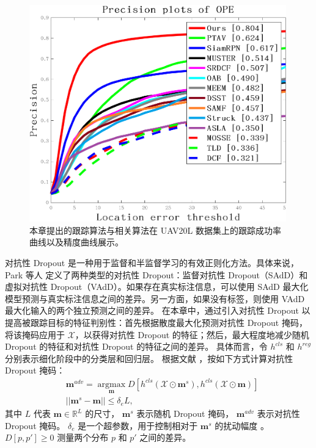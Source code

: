 \begin{figure}[t]
\begin{minipage}{0.48\textwidth}
  \centerline{\includegraphics[width=0.99\textwidth]{Img/end/quality_plot_error_OPE_threshold.png}}
\end{minipage}
\caption{本章提出的跟踪算法与相关算法在 UAV20L \cite{mueller2016benchmark} 数据集上的跟踪成功率曲线以及精度曲线展示。}
\label{fig:end_uav20l}
\end{figure}
对抗性 Dropout 是一种用于监督和半监督学习的有效正则化方法。具体来说，Park 等人 \cite{park2018adversarial} 定义了两种类型的对抗性 Dropout：监督对抗性 Dropout（SAdD）和虚拟对抗性 Dropout（VAdD）。如果存在真实标注信息，可以使用 SAdD 最大化模型预测与真实标注信息之间的差异。另一方面，如果没有标签，则使用 VAdD 最大化输入的两个独立预测之间的差异。%
在本章中，通过引入对抗性 Dropout 以提高被跟踪目标的特征判别性：首先根据散度最大化预测对抗性 Dropout 掩码，将该掩码应用于 $\mathcal{X}$，以获得对抗性 Dropout 的特征；然后，最大程度地减少随机 Dropout 的特征和对抗性 Dropout 的特征之间的差异。
具体而言，令 $h^{cls}$ 和 $h^{reg}$ 分别表示细化阶段中的分类层和回归层。
根据文献 \cite{lee2019drop}，按如下方式计算对抗性 Dropout 掩码：
\begin{equation}
\begin{split}
    & \mathbf{m}^{adv} = \mathop{\arg\max}\limits_{\mathbf{m}}D[h^{cls}(\mathcal{X} \odot \mathbf{m}^s), h^{cls}(\mathcal{X} \odot \mathbf{m})] \\
    & ||\mathbf{m}^s - \mathbf{m}|| \leq \delta_e L,
\end{split}
\end{equation}
其中 $L$ 代表 $\mathbf{m} \in \mathbb R^L$ 的尺寸，
$\mathbf{m}^s$ 表示随机 Dropout 掩码， $\mathbf{m}^{adv}$ 表示对抗性 Dropout 掩码。
$\delta_{e}$ 是一个超参数，用于控制相对于 $\mathbf{m}^{s}$ 的扰动幅度 \cite{lee2019drop}。
$D[p, p'] \geq 0$ 测量两个分布 $p$ 和 $p'$ 之间的差异。

